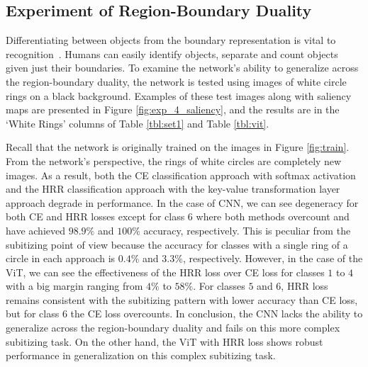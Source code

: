 \documentclass[letterpaper]{article} %
\begin{document}
\subsection{Experiment of Region-Boundary Duality}
Differentiating between objects from the boundary representation is vital to recognition~\cite{b7}. Humans can easily identify objects, separate and count objects given just their boundaries. To examine the network’s ability to generalize across the region-boundary duality, the network is tested using images of white circle rings on a black background. Examples of these test images along with saliency maps are presented in Figure \ref{fig:exp_4_saliency}, and the results are in the `White Rings’ columns of Table \ref{tbl:set1} and Table \ref{tbl:vit}.
\par
Recall that the network is originally trained on the images in Figure \ref{fig:train}.  From the network’s perspective, the rings of white circles are completely new images. As a result, both the CE classification approach with softmax activation and the HRR classification approach with the key-value transformation layer approach degrade in performance. In the case of CNN, we can see degeneracy for both CE and HRR losses except for class $6$ where both methods overcount and have achieved $98.9\%$ and $100\%$ accuracy, respectively. This is peculiar from the subitizing point of view because the accuracy for classes with a single ring of a circle in each approach is $0.4\%$ and $3.3\%$, respectively. However, in the case of the ViT, we can see the effectiveness of the HRR loss over CE loss for classes $1$ to $4$ with a big margin ranging from $4\%$ to $58\%$. For classes $5$ and $6$, HRR loss remains consistent with the subitizing pattern with lower accuracy than CE loss, but for class $6$ the CE loss overcounts. In conclusion, the CNN lacks the ability to generalize across the region-boundary duality and fails on this more complex subitizing task.  On the other hand, the ViT with HRR loss shows robust performance in generalization on this complex subitizing task.
\end{document}
